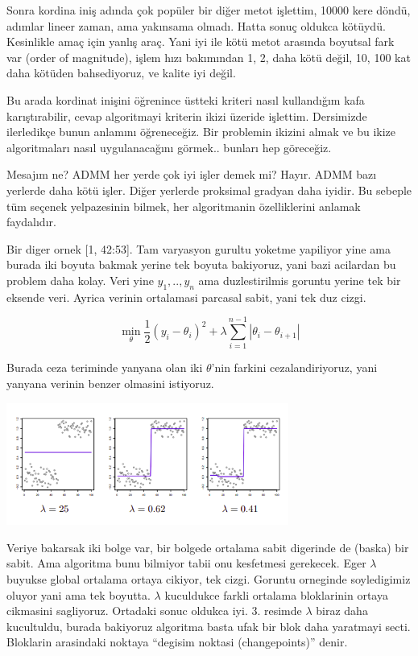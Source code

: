 \documentclass[12pt,fleqn]{article}\usepackage{../../common}
\begin{document}
Sonra kordina iniş adında çok popüler bir diğer metot işlettim, 10000 kere
döndü, adımlar lineer zaman, ama yakınsama olmadı. Hatta sonuç oldukca
kötüydü. Kesinlikle amaç için yanlış araç. Yani iyi ile kötü metot arasında
boyutsal fark var (order of magnitude), işlem hızı bakımından 1, 2, daha
kötü değil, 10, 100 kat daha kötüden bahsediyoruz, ve kalite iyi değil.

Bu arada kordinat inişini öğrenince üstteki kriteri nasıl kullandığım kafa
karıştırabilir, cevap algoritmayi kriterin ikizi üzeride
işlettim. Dersimizde ilerledikçe bunun anlamını öğreneceğiz. Bir problemin
ikizini almak ve bu ikize algoritmaları nasıl uygulanacağını
görmek.. bunları hep göreceğiz. 

Mesajım ne? ADMM her yerde çok iyi işler demek mi? Hayır. ADMM bazı
yerlerde daha kötü işler. Diğer yerlerde proksimal gradyan daha iyidir. Bu
sebeple tüm seçenek yelpazesinin bilmek, her algoritmanin özelliklerini
anlamak faydalıdır. 

Bir diger ornek [1, 42:53]. Tam varyasyon gurultu yoketme yapiliyor yine
ama burada iki boyuta bakmak yerine tek boyuta bakiyoruz, yani bazi
acilardan bu problem daha kolay. Veri yine $y_1,..,y_n$ ama duzlestirilmis
goruntu yerine tek bir eksende veri. Ayrica verinin ortalamasi parcasal
sabit, yani tek duz cizgi. 

$$
\min_\theta \frac{1}{2} (y_i-\theta_i)^2 + 
\lambda \sum_{i=1}^{n-1} |\theta_i - \theta_{i+1}|
$$

Burada ceza teriminde yanyana olan iki $\theta$'nin farkini
cezalandiriyoruz, yani yanyana verinin benzer olmasini istiyoruz. 

\includegraphics[width=25em]{func_19_intro_02.png}

Veriye bakarsak iki bolge var, bir bolgede ortalama sabit digerinde de
(baska) bir sabit. Ama algoritma bunu bilmiyor tabii onu kesfetmesi
gerekecek. Eger $\lambda$ buyukse global ortalama ortaya cikiyor, tek
cizgi. Goruntu orneginde soyledigimiz oluyor yani ama tek
boyutta. $\lambda$ kuculdukce farkli ortalama bloklarinin ortaya cikmasini
sagliyoruz. Ortadaki sonuc oldukca iyi. 3. resimde $\lambda$ biraz daha
kucultuldu, burada bakiyoruz algoritma basta ufak bir blok daha yaratmayi
secti. Bloklarin arasindaki noktaya ``degisim noktasi (changepoints)''
denir. 
\end{document}
